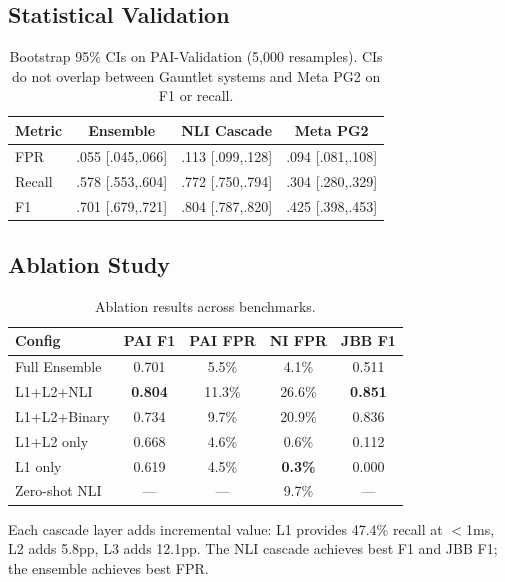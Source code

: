 \documentclass[11pt]{article}
\begin{document}
\subsection{Statistical Validation}

\begin{table}[h]
\centering
\small
\begin{tabular}{lccc}
\toprule
\textbf{Metric} & \textbf{Ensemble} & \textbf{NLI Cascade} & \textbf{Meta PG2} \\
\midrule
FPR & .055 [.045,.066] & .113 [.099,.128] & .094 [.081,.108] \\
Recall & .578 [.553,.604] & .772 [.750,.794] & .304 [.280,.329] \\
F1 & .701 [.679,.721] & .804 [.787,.820] & .425 [.398,.453] \\
\bottomrule
\end{tabular}
\caption{Bootstrap 95\% CIs on PAI-Validation (5,000 resamples). CIs do not overlap between Gauntlet systems and Meta PG2 on F1 or recall.}
\end{table}

\subsection{Ablation Study}

\begin{table}[h]
\centering
\small
\begin{tabular}{lcccc}
\toprule
\textbf{Config} & \textbf{PAI F1} & \textbf{PAI FPR} & \textbf{NI FPR} & \textbf{JBB F1} \\
\midrule
Full Ensemble & 0.701 & 5.5\% & 4.1\% & 0.511 \\
L1+L2+NLI & \textbf{0.804} & 11.3\% & 26.6\% & \textbf{0.851} \\
L1+L2+Binary & 0.734 & 9.7\% & 20.9\% & 0.836 \\
L1+L2 only & 0.668 & 4.6\% & 0.6\% & 0.112 \\
L1 only & 0.619 & 4.5\% & \textbf{0.3\%} & 0.000 \\
Zero-shot NLI & --- & --- & 9.7\% & --- \\
\bottomrule
\end{tabular}
\caption{Ablation results across benchmarks.}
\end{table}

Each cascade layer adds incremental value: L1 provides 47.4\% recall at $<$1ms, L2 adds 5.8pp, L3 adds 12.1pp. The NLI cascade achieves best F1 and JBB F1; the ensemble achieves best FPR.
\end{document}
